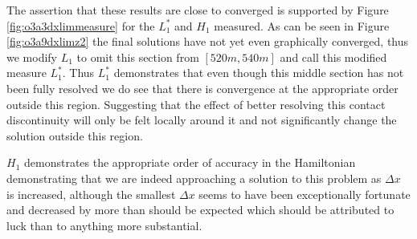 \documentclass[SingleSpace,12pt,Journal]{Serre_ASCE}
\begin{document}
The assertion that these results are close to converged is supported by Figure \ref{fig:o3a3dxlimmeasure} for the $L^*_1$ and $H_1$ measured. As can be seen in Figure \ref{fig:o3a9dxlimz2} the final solutions have not yet even graphically converged, thus we modify $L_1$ to omit this section from $[520m,540m]$ and call this modified measure $L^*_1$. Thus $L^*_1$ demonstrates that even though this middle section has not been fully resolved we do see that there is convergence at the appropriate order outside this region. Suggesting that the effect of better resolving this contact discontinuity will only be felt locally around it and not significantly change the solution outside this region. 

$H_1$ demonstrates the appropriate order of accuracy in the Hamiltonian demonstrating that we are indeed approaching a solution to this problem as $\Delta x$ is increased, although the smallest $\Delta x$ seems to have been exceptionally fortunate and decreased by more than should be expected which should be attributed to luck than to anything more substantial. 
\end{document}
